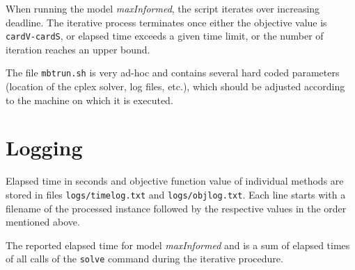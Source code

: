 \documentclass[12pt]{article}
\begin{document}
When running the model \emph{maxInformed}, the script iterates over increasing deadline. 
The iterative process terminates once either the objective value is \texttt{cardV-cardS}, or elapsed time exceeds a given time limit, or the number of iteration reaches an upper bound.

The file \texttt{mbtrun.sh} is very ad-hoc and contains several hard coded parameters (location of the cplex solver, log files, etc.), 
which should be adjusted according to the machine on which it is executed.

\section{Logging}

Elapsed time in seconds and objective function value of individual methods are stored in files \texttt{logs/timelog.txt} and \texttt{logs/objlog.txt}.
Each line starts with a filename of the processed instance followed by the respective values in the order mentioned above.

The reported elapsed time for model \emph{maxInformed} and is a sum of elapsed times of all calls of the \texttt{solve} command during the iterative procedure.
\end{document}
